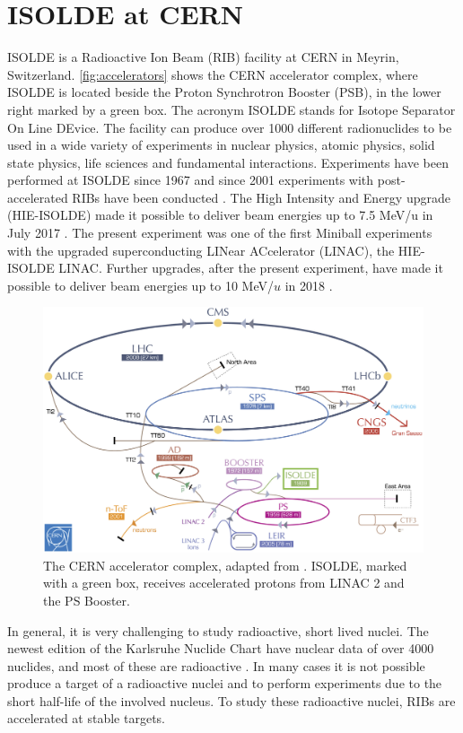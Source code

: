 \documentclass[twoside,english]{uiofysmaster/uiofysmaster}
\let\orgautoref\autoref
\renewcommand{\autoref}
        {%
		 \def\sectionautorefname{Section}%
		 \def\subsectionautorefname{Section}%
		 \def\subsubsectionautorefname{Section}%
		 \def\chapterautorefname{Chapter}%
          \orgautoref}
\begin{document}
\section{ISOLDE at CERN}
ISOLDE is a Radioactive Ion Beam (RIB) facility at CERN in Meyrin, Switzerland. \autoref{fig:accelerators} shows the CERN accelerator complex, where ISOLDE is located beside the Proton Synchrotron Booster (PSB), in the lower right marked by a green box. The acronym ISOLDE stands for Isotope Separator On Line DEvice. The facility can produce over 1000 different radionuclides to be used in a wide variety of experiments in nuclear physics, atomic physics, solid state physics, life sciences and fundamental interactions. Experiments have been performed at ISOLDE since 1967 and since 2001 experiments with post-accelerated RIBs have been conducted  \cite{HIE-ISOLDE, ISOLDE-web, ISOLDE-facility}. 
The High Intensity and Energy upgrade (HIE-ISOLDE) made it possible to deliver beam energies up to 7.5 MeV/u in July 2017 \cite{CERN-news}. 
The present experiment was one of the first Miniball experiments with the upgraded superconducting LINear ACcelerator (LINAC), the HIE-ISOLDE LINAC. 
Further upgrades, after the present experiment, have made it possible to deliver beam energies up to 10 MeV/$u$ in 2018 \cite{HIE-ISOLDE}. 

\begin{figure}[ht]
	\centering
	\includegraphics[width=\textwidth]{Images/CERN-accelerators.png}
	\caption{The CERN accelerator complex, adapted from \cite{CERN-AC}. ISOLDE, marked with a green box, receives accelerated protons from LINAC 2 and the PS Booster.}
	\label{fig:accelerators}
\end{figure}

In general, it is very challenging to study radioactive, short lived nuclei. 
The newest edition of the Karlsruhe Nuclide Chart have nuclear data of over 4000 nuclides, and most of these are radioactive \cite{CoN}. 
In many cases it is not possible produce a target of a radioactive nuclei and to perform experiments due to the short half-life of the involved nucleus. 
To study these radioactive nuclei, RIBs are accelerated at stable targets. 
\end{document}
